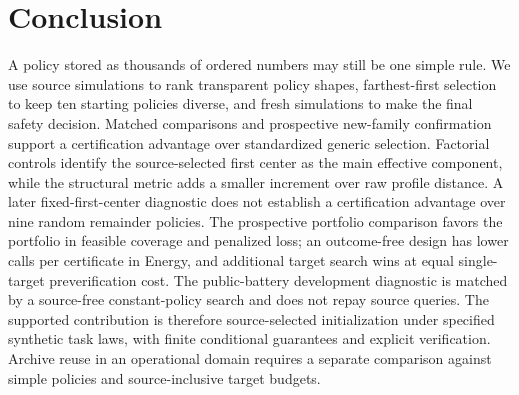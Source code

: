 \section{Conclusion}\label{sec:conclusion}

A policy stored as thousands of ordered numbers may still be one simple rule.
We use source simulations to rank transparent policy shapes, farthest-first
selection to keep ten starting policies diverse, and fresh simulations to make
the final safety decision.  Matched comparisons and prospective new-family
confirmation support a certification advantage over standardized generic
selection.  Factorial controls identify the source-selected first center as
the main effective component, while the structural metric adds a smaller
increment over raw profile distance.  A later fixed-first-center diagnostic
does not establish a certification advantage over nine random remainder
policies.  The prospective portfolio comparison
favors the portfolio in feasible coverage and penalized loss; an outcome-free
design has lower calls per certificate in Energy, and additional target search wins at equal
single-target preverification cost.  The public-battery development diagnostic is matched by a source-free
constant-policy search and does not repay source queries.  The supported
contribution is therefore source-selected initialization under specified
synthetic task laws, with finite conditional guarantees and explicit
verification.  Archive reuse in an operational domain requires a separate
comparison against simple policies and source-inclusive target budgets.
